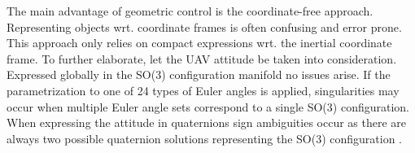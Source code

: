 The main advantage of geometric control is the coordinate-free approach. Representing objects wrt. coordinate frames is often confusing and error prone. This approach only relies on compact expressions wrt. the inertial coordinate frame. To further elaborate, let the UAV attitude be taken into consideration. Expressed globally in the SO(3) configuration manifold no issues arise. If the parametrization to one of 24 types of Euler angles is applied, singularities may occur when multiple Euler angle sets correspond to a single SO(3) configuration. When expressing the attitude in quaternions sign ambiguities occur as there are always two possible quaternion solutions representing the SO(3) configuration \cite{euler}.